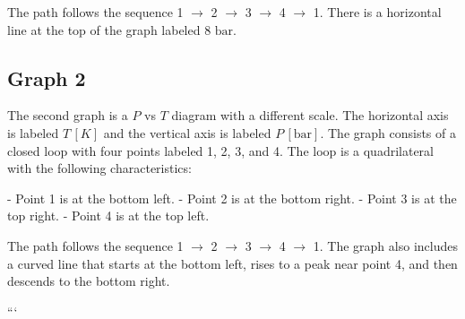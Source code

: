 The path follows the sequence 1 $\rightarrow$ 2 $\rightarrow$ 3 $\rightarrow$ 4 $\rightarrow$ 1. There is a horizontal line at the top of the graph labeled $8 \text{ bar}$.

\subsection*{Graph 2}

The second graph is a $P$ vs $T$ diagram with a different scale. The horizontal axis is labeled $T \, [K]$ and the vertical axis is labeled $P \, [\text{bar}]$. The graph consists of a closed loop with four points labeled 1, 2, 3, and 4. The loop is a quadrilateral with the following characteristics:

- Point 1 is at the bottom left.
- Point 2 is at the bottom right.
- Point 3 is at the top right.
- Point 4 is at the top left.

The path follows the sequence 1 $\rightarrow$ 2 $\rightarrow$ 3 $\rightarrow$ 4 $\rightarrow$ 1. The graph also includes a curved line that starts at the bottom left, rises to a peak near point 4, and then descends to the bottom right.

```